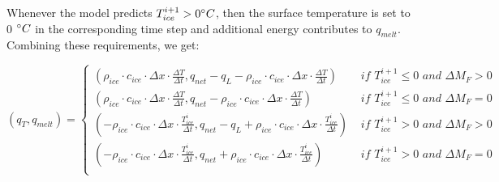 \documentclass[utf8]{frontiersSCNS} %
\begin{document}
Whenever the model predicts $T_{ice}^{i+1} > 0 \degree C$, then the surface temperature is set to 0 $\degree C$ in the
corresponding time step and additional energy contributes to $q_{melt}$. Combining these requirements, we get:

\begin{equation} (q_{T}, q_{melt}) = \left\{ \begin{array}{ll} ( \rho_{ice} \cdot c_{ice} \cdot  \Delta x \cdot
    \frac{\Delta T}{\Delta t}, q_{net}-q_{L}-\rho_{ice} \cdot c_{ice} \cdot  \Delta x \cdot \frac{\Delta T}{\Delta t})
    & \textit{ if } T_{ice}^{i+1}\leq 0 \textit{ and } \Delta M_{F} > 0\\ ( \rho_{ice} \cdot c_{ice} \cdot  \Delta x
    \cdot \frac{\Delta T}{\Delta t}, q_{net}-\rho_{ice} \cdot c_{ice} \cdot  \Delta x \cdot \frac{\Delta T}{\Delta t})
    & \textit{ if } T_{ice}^{i+1}\leq 0 \textit{ and } \Delta M_{F} = 0\\
        ( -\rho_{ice} \cdot c_{ice} \cdot  \Delta x \cdot \frac{T_{ice}^{i}}{\Delta t}, q_{net}-q_{L}+\rho_{ice} \cdot
    c_{ice} \cdot \Delta x \cdot \frac{T_{ice}^{i}}{\Delta t}) & \textit{ if } T_{ice}^{i+1}> 0 \textit{ and } \Delta
    M_{F} > 0\\ ( -\rho_{ice} \cdot c_{ice} \cdot  \Delta x \cdot \frac{T_{ice}^{i}}{\Delta t}, q_{net}+\rho_{ice}
    \cdot c_{ice} \cdot  \Delta x \cdot \frac{T_{ice}^{i}}{\Delta t}) & \textit{ if } T_{ice}^{i+1}> 0 \textit{ and }
\Delta M_{F} = 0\\ \end{array} \right.  \label{eqn:qt} \end{equation}
\end{document}
